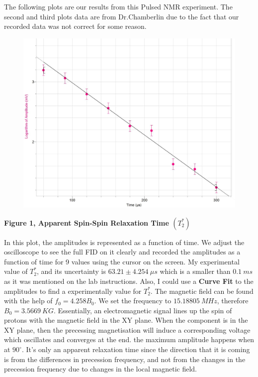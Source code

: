 \documentclass[fleqn]{article}
\begin{document}
  \vspace{10px}

  The following plots are our results from this Pulsed NMR experiment. The second and third plots data are from Dr.Chamberlin due to the fact that our recorded data 
  was not correct for some reason.

  \pagebreak

  \includegraphics[height=9cm, width=14cm]{Fig1.JPG}
  
  \textbf{Figure 1, Apparent Spin-Spin Relaxation Time $(T_2^*)$}

  \vspace{10px}

  In this plot, the amplitudes is represented as a function of time. We adjust the oscilloscope to see 
  the full FID on it clearly and recorded the amplitudes as a function of time for 9 values using the cursor on the 
  screen. My experimental value of $T_2^*$, and its uncertainty is $63.21 \pm 4.254 ~ \mu s$ which is a smaller than $0.1 ~ ms$ as 
  it was mentioned on the lab instructions. Also, I could use a \textbf{Curve Fit} to the amplitudes to find a experimentally value for $T_2^*$.
  The magnetic field can be found with the help of $f_0=4.258 B_0$. We set the frequency to $15.18805 ~ MHz$, 
  therefore $B_0=3.5669 ~ KG$. Essentially, an electromagnetic signal lines up the spin of protons with the magnetic field in the XY plane.
  When the component is in the XY plane, then the precessing magnetisation will induce 
  a corresponding voltage which oscillates and converges at the end. the maximum amplitude happens when at $90^{\circ}$.
  It's only an apparent relaxation time since the direction that it is coming is from the differences in precession frequency, and not 
  from the changes in the precession frequency due to changes in the local magnetic field.
\end{document}
